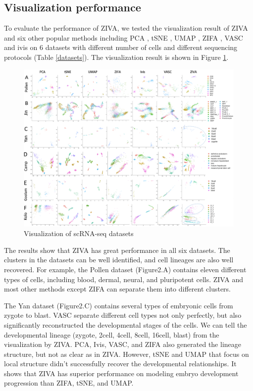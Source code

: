 \subsection{Visualization performance}
To evaluate the performance of ZIVA, we tested the visualization result of ZIVA and six other popular methods including PCA \cite{Abdi2010}, tSNE \cite{maaten2008visualizing}, UMAP \cite{McInnes2018}, ZIFA \cite{Pierson2015}, VASC \cite{Wang2018} and ivis \cite{Szubert2019} on 6 datasets with different number of cells and different sequencing protocols (Table \ref{datasets}). The visualization result is shown in Figure \ref{vis}.
\begin{figure}[htb!]
    \centering
    \includegraphics[width=1\textwidth]{figures/myfigures/visualizations.png}
    \caption{Visualization of scRNA-seq datasets}
    \label{vis}
\end{figure}
The results show that ZIVA has great performance in all six datasets. The clusters in the datasets can be well identified, and cell lineages are also well recovered. For example, the Pollen dataset (Figure2.A) contains eleven different types of cells, including blood, dermal, neural, and pluripotent cells. ZIVA and most other methods except ZIFA can separate them into different clusters. 

The Yan dataset (Figure2.C) contains several types of embryonic cells from zygote to blast. VASC separate different cell types not only perfectly, but also significantly reconstructed the developmental stages of the cells. We can tell the developmental lineage (zygote, 2cell, 4cell, 8cell, 16cell, blast) from the visualization by ZIVA. PCA, Ivis, VASC, and ZIFA also generated the lineage structure, but not as clear as in ZIVA. However, tSNE and UMAP that focus on local structure didn’t successfully recover the developmental relationships. It shows that ZIVA has superior performance on modeling embryo development progression than ZIFA, tSNE, and UMAP. 

